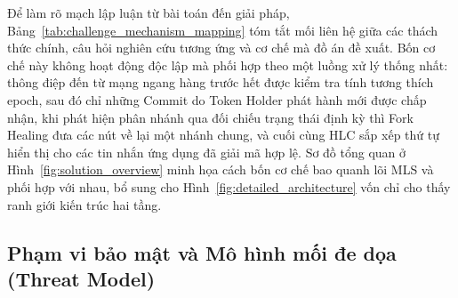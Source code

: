 \documentclass[../DoAn.tex]{subfiles}
\begin{document}
Để làm rõ mạch lập luận từ bài toán đến giải pháp, Bảng~\ref{tab:challenge_mechanism_mapping} tóm tắt mối liên hệ giữa các thách thức chính, câu hỏi nghiên cứu tương ứng và cơ chế mà đồ án đề xuất. Bốn cơ chế này không hoạt động độc lập mà phối hợp theo một luồng xử lý thống nhất: thông điệp đến từ mạng ngang hàng trước hết được kiểm tra tính tương thích epoch, sau đó chỉ những Commit do Token Holder phát hành mới được chấp nhận, khi phát hiện phân nhánh qua đối chiếu trạng thái định kỳ thì Fork Healing đưa các nút về lại một nhánh chung, và cuối cùng HLC sắp xếp thứ tự hiển thị cho các tin nhắn ứng dụng đã giải mã hợp lệ. Sơ đồ tổng quan ở Hình~\ref{fig:solution_overview} minh họa cách bốn cơ chế bao quanh lõi MLS và phối hợp với nhau, bổ sung cho Hình~\ref{fig:detailed_architecture} vốn chỉ cho thấy ranh giới kiến trúc hai tầng.

\begin{table}[htbp]
    \centering
    \small
    \caption{Mối liên hệ giữa thách thức, câu hỏi nghiên cứu và cơ chế đề xuất}
    \label{tab:challenge_mechanism_mapping}
\end{table}

\subsection{Phạm vi bảo mật và Mô hình mối đe dọa (Threat Model)}
\end{document}
